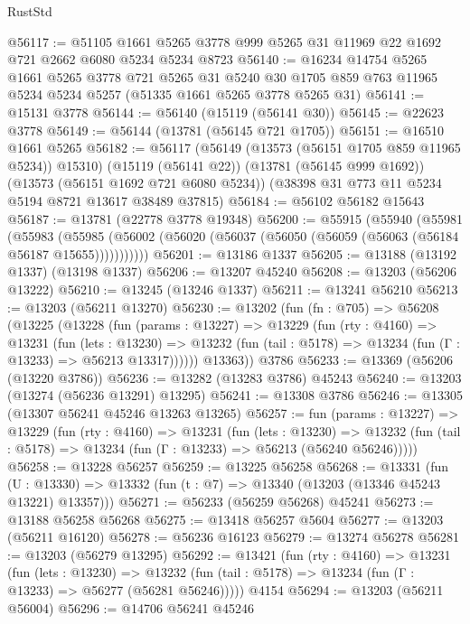 \begin{lexlean}{RustStd}
\begin{coremodule}
@56117 := @51105
    @1661
    @5265
    @3778
    @999
    @5265
    @31
    @11969
    @22
    @1692
    @721
    @2662
    @6080
    @5234
    @5234
    @8723
@56140 := @16234
    @14754
    @5265
    @1661
    @5265
    @3778
    @721
    @5265
    @31
    @5240
    @30
    @1705
    @859
    @763
    @11965
    @5234
    @5234
    @5257
    (@51335 @1661 @5265 @3778 @5265 @31)
@56141 := @15131 @3778
@56144 := @56140 (@15119 (@56141 @30))
@56145 := @22623 @3778
@56149 := @56144 (@13781 (@56145 @721 @1705))
@56151 := @16510 @1661 @5265
@56182 := @56117
    (@56149 (@13573 (@56151 @1705 @859 @11965 @5234)) @15310)
    (@15119 (@56141 @22))
    (@13781 (@56145 @999 @1692))
    (@13573 (@56151 @1692 @721 @6080 @5234))
    (@38398 @31 @773 @11 @5234 @5194 @8721 @13617 @38489 @37815)
@56184 := @56102 @56182 @15643
@56187 := @13781 (@22778 @3778 @19348)
@56200 := @55915
    (@55940
      (@55981
        (@55983
          (@55985 (@56002 (@56020 (@56037 (@56050 (@56059 (@56063 (@56184 @56187 @15655)))))))))))
@56201 := @13186 @1337
@56205 := @13188 (@13192 @1337) (@13198 @1337)
@56206 := @13207 @45240
@56208 := @13203 (@56206 @13222)
@56210 := @13245 (@13246 @1337)
@56211 := @13241 @56210
@56213 := @13203 (@56211 @13270)
@56230 := @13202
    (fun (fn : @705) =>
    @56208
      (@13225
        (@13228
          (fun (params : @13227) =>
          @13229
            (fun (rty : @4160) =>
            @13231
              (fun (lets : @13230) =>
              @13232 (fun (tail : @5178) => @13234 (fun (Γ : @13233) => @56213 @13317))))))
        @13363))
    @3786
@56233 := @13369 (@56206 (@13220 @3786))
@56236 := @13282 (@13283 @3786) @45243
@56240 := @13203 (@13274 (@56236 @13291) @13295)
@56241 := @13308 @3786
@56246 := @13305 (@13307 @56241 @45246 @13263 @13265)
@56257 := fun (params : @13227) =>
  @13229
    (fun (rty : @4160) =>
    @13231
      (fun (lets : @13230) =>
      @13232 (fun (tail : @5178) => @13234 (fun (Γ : @13233) => @56213 (@56240 @56246)))))
@56258 := @13228 @56257
@56259 := @13225 @56258
@56268 := @13331
    (fun (U : @13330) => @13332 (fun (t : @7) => @13340 (@13203 (@13346 @45243 @13221) @13357)))
@56271 := @56233 (@56259 @56268) @45241
@56273 := @13188 @56258 @56268
@56275 := @13418 @56257 @5604
@56277 := @13203 (@56211 @16120)
@56278 := @56236 @16123
@56279 := @13274 @56278
@56281 := @13203 (@56279 @13295)
@56292 := @13421
    (fun (rty : @4160) =>
    @13231
      (fun (lets : @13230) =>
      @13232 (fun (tail : @5178) => @13234 (fun (Γ : @13233) => @56277 (@56281 @56246)))))
    @4154
@56294 := @13203 (@56211 @56004)
@56296 := @14706 @56241 @45246

\end{coremodule}
\end{lexlean}

